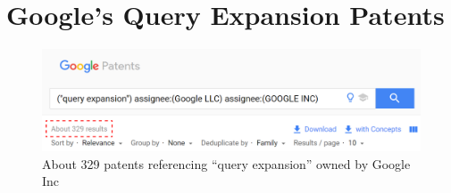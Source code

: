 \appendix

\chapter{Google's Query Expansion Patents}
\label{appendix:googlepatent}
\begin{figure}[h]
    \includegraphics[width=\textwidth]{graphics/google-patents.png}
    \caption{About 329 patents referencing ``query expansion'' owned by Google Inc}
\end{figure}

